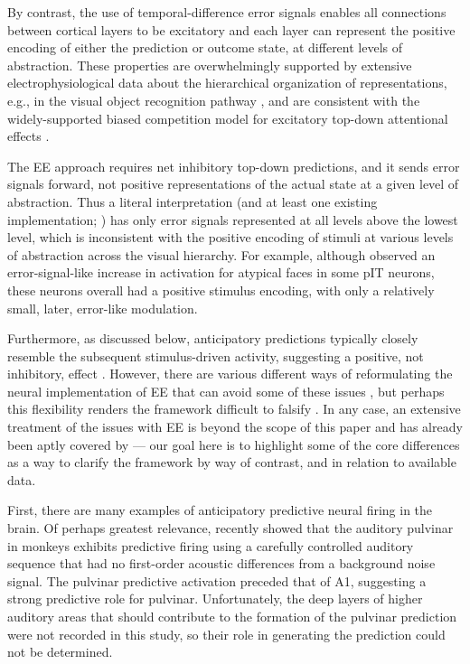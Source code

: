 \documentclass[11pt,twoside]{article}
\newif\myifpdf
\begin{document}
By contrast, the use of temporal-difference error signals enables all connections between cortical layers to be excitatory and each layer can represent the positive encoding of either the prediction or outcome state, at different levels of abstraction.  These properties are overwhelmingly supported by extensive electrophysiological data about the hierarchical organization of representations, e.g., in the visual object recognition pathway \citep{KobatakeTanaka94,VanRullenThorpe02,CadieuHongYaminsEtAl14}, and are consistent with the widely-supported biased competition model for excitatory top-down attentional effects \citep{DesimoneDuncan95,ReynoldsChelazziDesimone99,MillerCohen01,OReillyWyatteHerdEtAl13}.

The EE approach requires net inhibitory top-down predictions, and it sends error signals forward, not positive representations of the actual state at a given level of abstraction.  Thus a literal interpretation (and at least one existing implementation; \citealp{LotterKreimanCox16}) has only error signals represented at all levels above the lowest level, which is inconsistent with the positive encoding of stimuli at various levels of abstraction across the visual hierarchy.  For example, although \citet{IssaCadieuDiCarlo18} observed an error-signal-like increase in activation for atypical faces in some pIT neurons, these neurons overall had a positive stimulus encoding, with only a relatively small, later, error-like modulation.

Furthermore, as discussed below, anticipatory predictions typically closely resemble the subsequent stimulus-driven activity, suggesting a positive, not inhibitory, effect  \citep{DuhamelColbyGoldberg92,LeeMumford03,CavanaghHuntAfrazEtAl10,WalshMcGovernClarkEtAl20}.  However, there are various different ways of reformulating the neural implementation of EE that can avoid some of these issues \citep{Spratling08,BastosUsreyAdamsEtAl12}, but perhaps this flexibility renders the framework difficult to falsify \citep{KogoTrengove15}.  In any case, an extensive treatment of the issues with EE is beyond the scope of this paper and has already been aptly covered by \citet{WalshMcGovernClarkEtAl20} --- our goal here is to highlight some of the core differences as a way to clarify the framework by way of contrast, and in relation to available data.

First, there are many examples of anticipatory predictive neural firing in the brain.  Of perhaps greatest relevance, \citet{BarczakOConnellMcGinnisEtAl18} recently showed that the auditory pulvinar in monkeys exhibits predictive firing using a carefully controlled auditory sequence that had no first-order acoustic differences from a background noise signal.  The pulvinar predictive activation preceded that of A1, suggesting a strong predictive role for pulvinar.  Unfortunately, the deep layers of higher auditory areas that should contribute to the formation of the pulvinar prediction were not recorded in this study, so their role in generating the prediction could not be determined.
\end{document}
